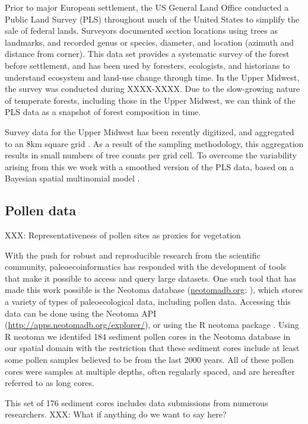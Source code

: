 \documentclass[12pt]{article}
\begin{document}
Prior to major European settlement, the US General Land Office
conducted a Public Land Survey (PLS) throughout much of the United
States to simplify the sale of federal lands. Surveyors
documented section locations using trees as landmarks, and recorded
genus or species, diameter, and location (azimuth and distance from
corner). This data set provides a systematic survey of the forest
before settlement, and has been used by foresters, ecologists, and
historians to understand ecosystem and land-use change through
time. In the Upper Midwest, the survey was conducted during
XXXX-XXXX. Due to the slow-growing nature of temperate forests,
including those in the Upper Midwest, we can think of the PLS data as
a snapshot of forest composition in time. 

Survey data for the Upper Midwest has been recently digitized, and
aggregated to an 8km square grid \cite{XXX}. As a result of the
sampling methodology, this aggregation results in small numbers of
tree counts per grid cell. To overcome the variability arising from
this we work with a smoothed version of the PLS data, based on a
Bayesian spatial multinomial model \cite{paciorekXXX}. 

\subsection{Pollen data}
XXX: Representativeness of pollen sites as proxies for vegetation

With the push for robust and reproducible research from the scientific
community, paleoecoinformatics has responded with the development of
tools that make it possible to access and query large datasets. One
such tool that has made this work possible is the Neotoma database
(\url{neotomadb.org}; \cite{XXX}), which stores a variety of types of
paleoecological data, including pollen data. Accessing this data can
be done using the Neotoma API
(\url{http://apps.neotomadb.org/explorer/}), or using the R neotoma
package \cite{goring2015}. Using R neotoma we identifed 184 sediment
pollen cores in the Neotoma database in our spatial domain with the
restriction that these sediment cores include at least some pollen
samples believed to be from the last 2000 years. All of these pollen
cores were samples at multiple depths, often regularly spaced, and are
hereafter referred to as long cores.

This set of 176 sediment cores includes data submissions from numerous
researchers. XXX: What if anything do we want to say here?
\end{document}

